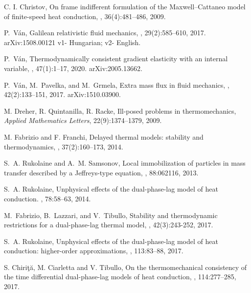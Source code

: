 \documentclass[sn-mathphys]{sn-jnl}%
\theoremstyle{thmstyleone}%
\theoremstyle{thmstyletwo}%
\theoremstyle{thmstylethree}%
\begin{document}
\begin{thebibliography}{9}
	C. I. Christov,
	\newblock On frame indifferent formulation of the {M}axwell--{C}attaneo model
	of finite-speed heat conduction,
	, 36(4):481--486, 2009.
	
	P.~V\'an,
	\newblock Galilean relativistic fluid mechanics,
	, 29(2):585--610, 2017.
	\newblock arXiv:1508.00121 v1- Hungarian; v2- English.
	
	P.~V\'an,
	\newblock Thermodynamically consistent gradient elasticity with an internal
	variable,
	, 47(1):1--17, 2020.
	\newblock arXiv:2005.13662.
	
	P.~V\'an, M.~Pavelka, and M.~Grmela,
	\newblock Extra mass flux in fluid mechanics,
	, 42(2):133--151,
	2017.
	\newblock arXiv:1510.03900.
	
	M. Dreher, R. Quintanilla, R. Racke,
	{Ill-posed problems in thermomechanics},
	{\em Applied Mathematics Letters}, 22(9):1374--1379, 2009.
	
	M. Fabrizio and F. Franchi,
	\newblock Delayed thermal models: stability and thermodynamics,
	, 37(2):160--173, 2014.
	
	S.~A. Rukolaine and A.~M. Samsonov,
	\newblock Local immobilization of particles in mass transfer described by a
	{J}effreys-type equation,
	, 88:062116, 2013.
	
	S.~A. Rukolaine,
	\newblock Unphysical effects of the dual-phase-lag model of heat conduction.
	, 78:58--63,
	2014.
	
	M.~Fabrizio, B.~Lazzari, and V.~Tibullo,
	\newblock Stability and thermodynamic restrictions for a dual-phase-lag thermal
	model,
	, 42(3):243-252, 2017.
	
	S.~A. Rukolaine,
	\newblock Unphysical effects of the dual-phase-lag model of heat conduction: higher-order approximations,
	, 113:83--88, 2017.
	
	S. Chiri{\c{t}}{\u{a}}, M. Ciarletta and V. Tibullo,
	\newblock On the thermomechanical consistency of the time differential dual-phase-lag models of heat conduction,
	, 114:277--285, 2017.
	

\end{thebibliography}
\end{document}
